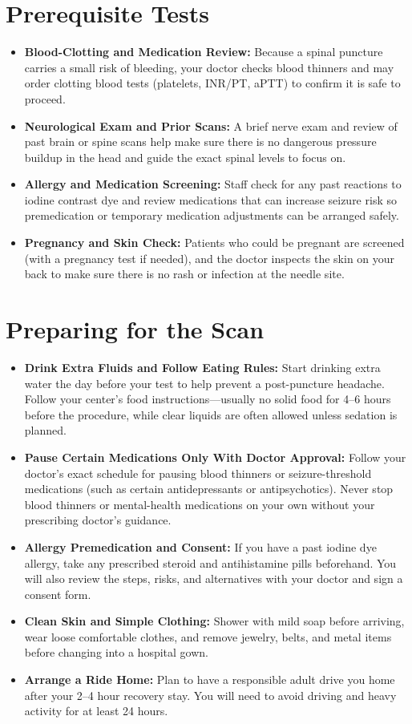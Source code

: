 \section{Prerequisite Tests}
\begin{itemize}
    \item \textbf{Blood-Clotting and Medication Review:} Because a spinal puncture carries a small risk of bleeding, your doctor checks blood thinners and may order clotting blood tests (platelets, INR/PT, aPTT) to confirm it is safe to proceed.
    \item \textbf{Neurological Exam and Prior Scans:} A brief nerve exam and review of past brain or spine scans help make sure there is no dangerous pressure buildup in the head and guide the exact spinal levels to focus on.
    \item \textbf{Allergy and Medication Screening:} Staff check for any past reactions to iodine contrast dye and review medications that can increase seizure risk so premedication or temporary medication adjustments can be arranged safely.
    \item \textbf{Pregnancy and Skin Check:} Patients who could be pregnant are screened (with a pregnancy test if needed), and the doctor inspects the skin on your back to make sure there is no rash or infection at the needle site.
\end{itemize}

\section{Preparing for the Scan}
\begin{itemize}
    \item \textbf{Drink Extra Fluids and Follow Eating Rules:} Start drinking extra water the day before your test to help prevent a post-puncture headache. Follow your center's food instructions---usually no solid food for 4--6 hours before the procedure, while clear liquids are often allowed unless sedation is planned.
    \item \textbf{Pause Certain Medications Only With Doctor Approval:} Follow your doctor's exact schedule for pausing blood thinners or seizure-threshold medications (such as certain antidepressants or antipsychotics). Never stop blood thinners or mental-health medications on your own without your prescribing doctor's guidance.
    \item \textbf{Allergy Premedication and Consent:} If you have a past iodine dye allergy, take any prescribed steroid and antihistamine pills beforehand. You will also review the steps, risks, and alternatives with your doctor and sign a consent form.
    \item \textbf{Clean Skin and Simple Clothing:} Shower with mild soap before arriving, wear loose comfortable clothes, and remove jewelry, belts, and metal items before changing into a hospital gown.
    \item \textbf{Arrange a Ride Home:} Plan to have a responsible adult drive you home after your 2--4 hour recovery stay. You will need to avoid driving and heavy activity for at least 24 hours.
\end{itemize}

